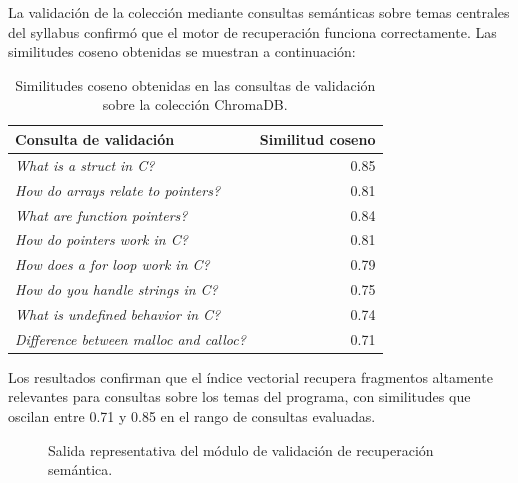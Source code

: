 \documentclass[12pt]{article}
\begin{document}
La validación de la colección mediante consultas semánticas sobre temas
centrales del syllabus confirmó que el motor de recuperación funciona
correctamente. Las similitudes coseno obtenidas se muestran a continuación:

\begin{table}[H]
    \centering
    \begin{tabular}{lr}
        \toprule
        \textbf{Consulta de validación} & \textbf{Similitud coseno} \\
        \midrule
        \textit{What is a struct in C?}              & 0.85 \\
        \textit{How do arrays relate to pointers?}   & 0.81 \\
        \textit{What are function pointers?}         & 0.84 \\
        \textit{How do pointers work in C?}          & 0.81 \\
        \textit{How does a for loop work in C?}      & 0.79 \\
        \textit{How do you handle strings in C?}     & 0.75 \\
        \textit{What is undefined behavior in C?}    & 0.74 \\
        \textit{Difference between malloc and calloc?} & 0.71 \\
        \bottomrule
    \end{tabular}
    \caption{Similitudes coseno obtenidas en las consultas de validación sobre la colección ChromaDB.}
\end{table}

Los resultados confirman que el índice vectorial recupera fragmentos altamente
relevantes para consultas sobre los temas del programa, con similitudes que
oscilan entre 0.71 y 0.85 en el rango de consultas evaluadas.

\begin{figure}[H]
    \centering
    \caption{Salida representativa del módulo de validación de recuperación semántica.}
\end{figure}
\end{document}
